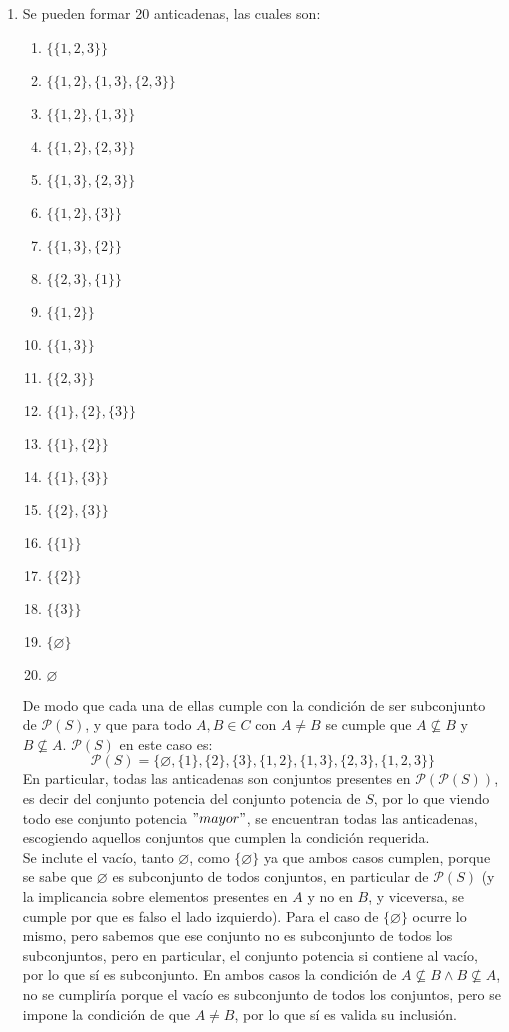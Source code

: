 \documentclass[letter]{article}
\begin{document}
	\begin{pregunta}{2}
		\begin{enumerate}
		\item
			Se pueden formar 20 anticadenas, las cuales son:
			\begin{multicols}{3}
				\begin{enumerate}[(1)]
					\item $\{\{1,2,3\}\}$
					\item $\{\{1,2\}, \{1,3\}, \{2,3\}\}$
					\item $\{\{1,2\}, \{1,3\}\}$
					\item $\{\{1,2\}, \{2,3\}\}$
					\item $\{\{1,3\}, \{2,3\}\}$
					\item $\{\{1,2\}, \{3\}\}$
					\item $\{\{1,3\}, \{2\}\}$
					\item $\{\{2,3\}, \{1\}\}$
					\item $\{\{1,2\}\}$
					\item $\{\{1,3\}\}$
					\item $\{\{2,3\}\}$
					\item $\{\{1\}, \{2\}, \{3\}\}$
					\item $\{\{1\}, \{2\}\}$
					\item $\{\{1\}, \{3\}\}$
					\item $\{\{2\}, \{3\}\}$
					\item $\{\{1\}\}$
					\item $\{\{2\}\}$
					\item $\{\{3\}\}$
					\item $\{\varnothing\}$
					\item $\varnothing$
				\end{enumerate}
			\end{multicols}
			De modo que cada una de ellas cumple con la condición de ser subconjunto de $\mathcal{P}(S)$, y que para todo $A, B \in C$ con $A \neq B$ se cumple que $A \nsubseteq B$ y $B \nsubseteq A$. $\mathcal{P}(S)$ en este caso es:$$\mathcal{P}(S)=\{\varnothing, \{1\}, \{2\}, \{3\}, \{1,2\}, \{1,3\}, \{2,3\}, \{1,2,3\}\}$$
			En particular, todas las anticadenas son conjuntos presentes en $\mathcal{P}(\mathcal{P}(S))$, es decir del conjunto potencia del conjunto potencia de $S$, por lo que viendo todo ese conjunto potencia $"mayor"$, se encuentran todas las anticadenas, escogiendo aquellos conjuntos que cumplen la condición requerida.\\Se inclute el vacío, tanto $\varnothing$, como $\{\varnothing\}$ ya que ambos casos cumplen, porque se sabe que $\varnothing$ es subconjunto de todos conjuntos, en particular de $\mathcal{P}(S)$ (y la implicancia sobre elementos presentes en $A$ y no en $B$, y viceversa, se cumple por que es falso el lado izquierdo). Para el caso de $\{\varnothing\}$ ocurre lo mismo, pero sabemos que ese conjunto no es subconjunto de todos los subconjuntos, pero en particular, el conjunto potencia si contiene al vacío, por lo que sí es subconjunto. En ambos casos la condición de $A\nsubseteq B \wedge B \nsubseteq A$, no se cumpliría porque el vacío es subconjunto de todos los conjuntos, pero se impone la condición de que $A\neq B$, por lo que sí es valida su inclusión.


\end{enumerate}
\end{pregunta}
\end{document}
